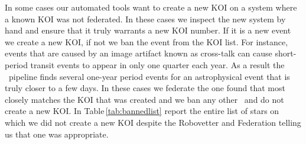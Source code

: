 In some cases our automated tools want to create a new KOI on a system where a known KOI was not federated.  In these cases we inspect the new system by hand and ensure that it truly warrants a new KOI number. If it is a new event we create a new KOI, if not we ban the event from the KOI list.  For instance, events that are caused by an image artifact known as cross-talk \citet{Coughlin2014a} can cause short-period transit events to appear in only one quarter each year. As a result the \Kepler\ pipeline finds several one-year period events for an astrophysical event that is truly closer to a few days.  In these cases we federate the one found that most closely matches the KOI that was created and we ban any other \opstce\ and do not create a new KOI.  In Table\,\ref{tab:bannedlist} report the entire list of stars on which we did not create a new KOI despite the Robovetter and Federation telling us that one was appropriate.






